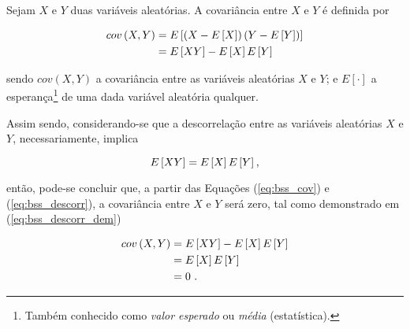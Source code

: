 \begin{definition}[Covariância]
    Sejam $X$ e $Y$ duas variáveis aleatórias. A covariância entre $X$ e $Y$ é definida por

    \begin{equation}
    \begin{aligned}
        cov\left(X, Y\right) & = E\left[\left(X-E\left[X\right]\right)\left(Y-E\left[Y\right]\right)\right] \\
         & = E\left[XY\right] - E\left[X\right] E\left[Y\right]
        \vspace{0.2cm}
        \label{eq:bss_cov}
    \end{aligned}
    \vspace{0.2cm}
    \end{equation}

    \noindent sendo $cov(X, Y)$ a covariância entre as variáveis aleatórias $X$ e $Y$; e $E[\cdot]$ a esperança\footnote{Também conhecido como \textit{valor esperado} ou \textit{média} (estatística).} de uma dada variável aleatória qualquer.
\end{definition}



Assim sendo, considerando-se que a descorrelação entre as variáveis aleatórias $X$ e $Y$, necessariamente, implica

\begin{equation}
    E\left[XY\right] = E\left[X\right] E\left[Y\right]
    \hspace{0.01cm},
    \vspace{0.2cm}
    \label{eq:bss_descorr}
\end{equation}

\noindent então, pode-se concluir que, a partir das Equações (\ref{eq:bss_cov}) e (\ref{eq:bss_descorr}), a covariância entre $X$ e $Y$ será zero, tal como demonstrado em (\ref{eq:bss_descorr_dem})

\begin{equation}
\begin{aligned}
    cov\left(X, Y\right) & = E\left[XY\right] - E\left[X\right] E\left[Y\right] \\
    & = E\left[X\right] E\left[Y\right] \\
    & = 0 \hspace{0.01cm}
    \hspace{0.1cm}.
    \vspace{0.2cm}
    \label{eq:bss_descorr_dem}
\end{aligned}
\vspace{0.2cm}
\end{equation}





